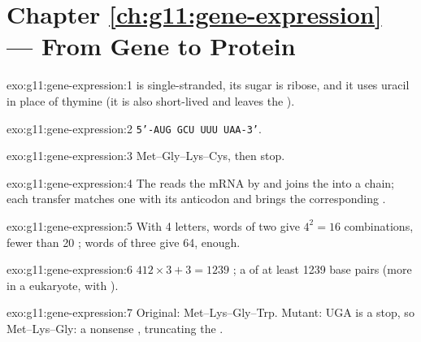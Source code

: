 \section*{Chapter \ref{ch:g11:gene-expression} --- From Gene to Protein}

\begin{solution}{exo:g11:gene-expression:1}
 is single-stranded, its sugar is ribose, and it uses uracil in
place of thymine (it is also short-lived and leaves the ).
\end{solution}

\begin{solution}{exo:g11:gene-expression:2}
\texttt{5'-AUG GCU UUU UAA-3'}.
\end{solution}

\begin{solution}{exo:g11:gene-expression:3}
Met--Gly--Lys--Cys, then stop.
\end{solution}

\begin{solution}{exo:g11:gene-expression:4}
The  reads the mRNA  by  and joins the 
into a chain; each transfer  matches one  with its anticodon
and brings the corresponding .
\end{solution}

\begin{solution}{exo:g11:gene-expression:5}
With 4 letters, words of two give $4^2 = 16$ combinations, fewer than
20 ; words of three give 64, enough.
\end{solution}

\begin{solution}{exo:g11:gene-expression:6}
$412 \times 3 + 3 = 1239$ ; a  of at least 1239 base
pairs (more in a eukaryote, with ).
\end{solution}

\begin{solution}{exo:g11:gene-expression:7}
Original: Met--Lys--Gly--Trp. Mutant: UGA is a stop, so Met--Lys--Gly:
a nonsense , truncating the .
\end{solution}

